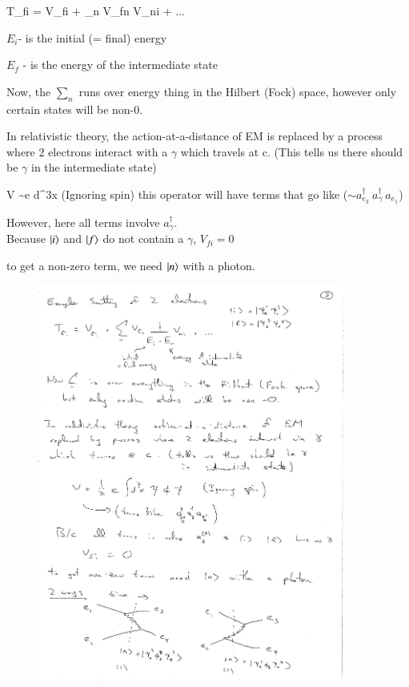 {\be
T_{fi} = V_{fi} + \sum_n V_{fn}  V_{ni} + ...
\ee

\bi
\item[-] $E_i$- is the initial (= final) energy
\item[-] $E_f$ - is the energy of the intermediate state
\ei

Now, the $\sum_n$ runs over energy thing in the Hilbert (Fock) space, however only certain states will be non-0.

In relativistic theory, the action-at-a-distance of EM is replaced by a process where 2 electrons interact with a $\gamma$ which travels at c. 
(This tells us there should be $\gamma$ in the intermediate state)


\be
V \sim e \int d^3x \psi \phi \psi  \hspace*{0.3in} \textrm{(Ignoring spin)}
\ee
this operator will have terms that go like ($\sim a_{e_3}^\dagger\ a_{\gamma}^\dagger\ a_{e_1}$)


However, here all terms involve $a_{\gamma}^\dagger$.\\
Because $\ket{i}$ and $\ket{f}$ do not contain a $\gamma$, $  V_{fi} = 0$

to get a non-zero term, we need $\ket{n}$ with a photon. 
\begin{figure}[h]
\centering
\includegraphics[width=0.9\textwidth]{./eeScattering.pdf}
\end{figure}





}


